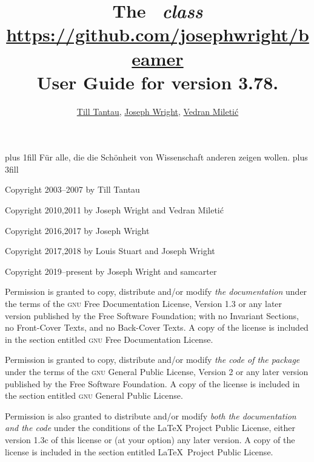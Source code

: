 \documentclass{ltxdoc}
\def\beamerugversion{3.78}
\begin{document}
{
  \vbox{}
  \vskip 0pt plus 1fill
  F\"ur alle, die die Sch\"onheit von Wissenschaft anderen zeigen wollen.
  \vskip 0pt plus 3fill

  \parindent 0pt
  Copyright 2003--2007 by Till Tantau

  Copyright 2010,2011 by Joseph Wright and Vedran Mileti\'c

  Copyright 2016,2017 by Joseph Wright

  Copyright 2017,2018 by Louis Stuart and Joseph Wright

  Copyright 2019--present by Joseph Wright and samcarter

  \medskip
  Permission is granted to copy, distribute and/or modify \emph{the documentation} under the terms of the \textsc{gnu} Free Documentation License, Version 1.3 or any later version published by the Free Software Foundation; with no Invariant Sections, no Front-Cover Texts, and no Back-Cover Texts. A copy of the license is included in the section entitled \textsc{gnu} Free Documentation License.

  \medskip
  Permission is granted to copy, distribute and/or modify \emph{the code of the package} under the terms of the \textsc{gnu} General Public License, Version 2 or any later version published by the Free Software Foundation. A copy of the license is included in the section entitled \textsc{gnu} General Public License.

  \medskip
  Permission is also granted to distribute and/or modify \emph{both the documentation and the code} under the conditions of the LaTeX Project Public License, either version 1.3c of this license or (at your option) any later version. A copy of the license is included in the section entitled \LaTeX\ Project Public License.

  \vbox{}
  \clearpage
}


\title{\Huge The \beamer\ \textit{class}\\
\Large\url{https://github.com/josephwright/beamer}\\
\Large User Guide for version \beamerugversion.}
\author{\href{mailto:tantau@users.sourceforge.net}{Till Tantau}, \href{mailto:joseph.wright@morningstar2.co.uk}{Joseph Wright}, \href{mailto:vmiletic@inf.uniri.hr}{Vedran Mileti\'c}}
\end{document}
